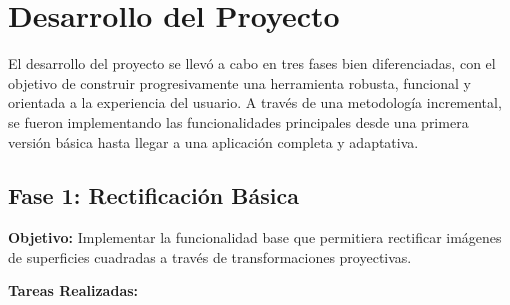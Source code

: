 
\chapter{Desarrollo del Proyecto}
\label{ch:otro}

El desarrollo del proyecto se llevó a cabo en tres fases bien diferenciadas, con el objetivo de construir progresivamente una herramienta robusta, funcional y orientada a la experiencia del usuario. A través de una metodología incremental, se fueron implementando las funcionalidades principales desde una primera versión básica hasta llegar a una aplicación completa y adaptativa.

\section{Fase 1: Rectificación Básica}

\textbf{Objetivo:} Implementar la funcionalidad base que permitiera rectificar imágenes de superficies cuadradas a través de transformaciones proyectivas.

\vspace{\baselineskip}

\textbf{Tareas Realizadas:}

